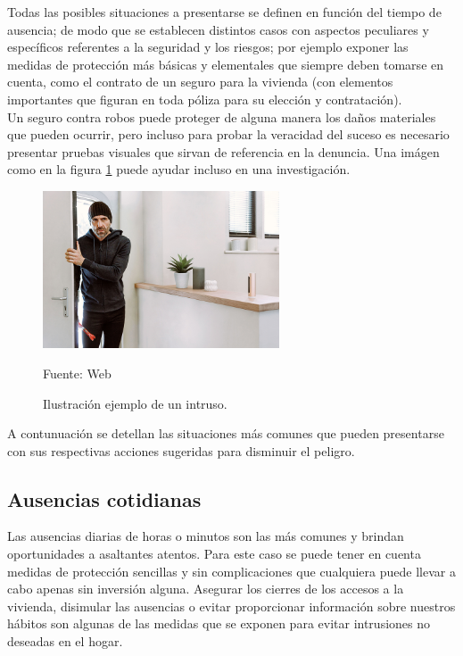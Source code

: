 Todas las posibles situaciones a presentarse se definen en función del tiempo de ausencia; de modo que se establecen distintos casos con aspectos peculiares y específicos referentes a la seguridad y los riesgos; por ejemplo exponer las medidas de protección más básicas y elementales que siempre deben tomarse en cuenta, como el contrato de un seguro para la vivienda (con elementos importantes que figuran en toda póliza para su elección y contratación).\\

Un seguro contra robos puede proteger de alguna manera los daños materiales que pueden ocurrir, pero incluso para probar la veracidad del suceso es necesario presentar pruebas visuales que sirvan de referencia en la denuncia. Una imágen como en la figura \ref{fig:intruso} puede ayudar incluso en una investigación.
\begin{figure}[H]
    \begin{center}
        \includegraphics[width=7cm]{img/capitulo_3/intruso.jpg}
    \end{center}
    \begin{center}
        \caption{Ilustración ejemplo de un intruso.}
        Fuente: Web
        \label{fig:intruso}
    \end{center}
\end{figure}

A contunuación se detellan las situaciones más comunes que pueden presentarse con sus respectivas acciones sugeridas para disminuir el peligro.

\subsection{Ausencias cotidianas}
Las ausencias diarias de horas o minutos son las más comunes y brindan oportunidades a asaltantes atentos. Para este caso se puede tener en cuenta medidas de protección sencillas y sin complicaciones que cualquiera puede llevar a cabo apenas sin inversión alguna. Asegurar los cierres de los accesos a la vivienda, disimular las ausencias o evitar proporcionar información sobre nuestros hábitos son algunas de las medidas que se exponen para evitar intrusiones no deseadas en el hogar.\\
 
